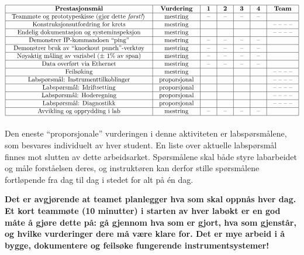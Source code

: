 $$\vbox{\offinterlineskip
\halign{\strut
\vrule \quad\hfil # \ \hfil & 
\vrule \quad\hfil # \ \hfil & 
\vrule \quad\hfil # \ \hfil & 
\vrule \quad\hfil # \ \hfil & 
\vrule \quad\hfil # \ \hfil & 
\vrule \quad\hfil # \ \hfil & 
\vrule \quad\hfil # \ \hfil \vrule \cr
\noalign{\hrule}
%
{\bf Prestasjonsmål} & {\bf Vurdering} & {\bf 1} & {\bf 2} & {\bf 3} & {\bf 4} & {\bf Team} \cr
%
\noalign{\hrule}
%
Teammøte og prototypeskisse (gjør dette {\it først!}) & mestring & -- & -- & -- & -- & \cr
%
\noalign{\hrule}
%
Konstruksjonsutfordring for krets & mestring & & & & & -- -- -- -- \cr
%
\noalign{\hrule}
%
Endelig dokumentasjon og systeminspeksjon & mestring & & & & & -- -- -- -- \cr
%
\noalign{\hrule}
%
Demonstrer IP-kommandoen ``ping'' & mestring & -- & -- & -- & -- &  \cr
%
\noalign{\hrule}
%
Demonstrer bruk av ``knockout punch''-verktøy & mestring & -- & -- & -- & -- &  \cr
%
\noalign{\hrule}
%
Nøyaktig måling av variabel ($\pm$ 1\% av span) & mestring & -- & -- & -- & -- &  \cr
%
\noalign{\hrule}
%
Data overført via Ethernet & mestring & -- & -- & -- & -- &  \cr
%
\noalign{\hrule}
%
Feilsøking & mestring & & & & & -- -- -- -- \cr
%
\noalign{\hrule}
%
Labspørsmål: Instrumenttilkoblinger & proporsjonal &  &  &  &  & -- -- -- -- \cr
%
\noalign{\hrule}
%
Labspørsmål: Idriftsetting & proporsjonal &  &  &  &  & -- -- -- -- \cr
%
\noalign{\hrule}
%
Labspørsmål: Hoderegning & proporsjonal &  &  &  &  & -- -- -- -- \cr
%
\noalign{\hrule}
%
Labspørsmål: Diagnostikk & proporsjonal &  &  &  &  & -- -- -- -- \cr
%
\noalign{\hrule}
%
Avvikling og opprydding i lab & mestring & -- & -- & -- & -- &  \cr
%
\noalign{\hrule}
} %
}$$ %

Den eneste ``proporsjonale'' vurderingen i denne aktiviteten er labspørsmålene, som besvares individuelt av hver student. En liste over aktuelle labspørsmål finnes mot slutten av dette arbeidsarket. Spørsmålene skal både styre labarbeidet og måle forståelsen deres, og instruktøren kan derfor stille spørsmålene fortløpende fra dag til dag i stedet for alt på én dag.

\vskip 10pt

{\bf Det er avgjørende at teamet planlegger hva som skal oppnås hver dag. Et kort teammøte (10 minutter) i starten av hver labøkt er en god måte å gjøre dette på: gå gjennom hva som er gjort, hva som gjenstår, og hvilke vurderinger dere må være klare for. Det er mye arbeid i å bygge, dokumentere og feilsøke fungerende instrumentsystemer!}

